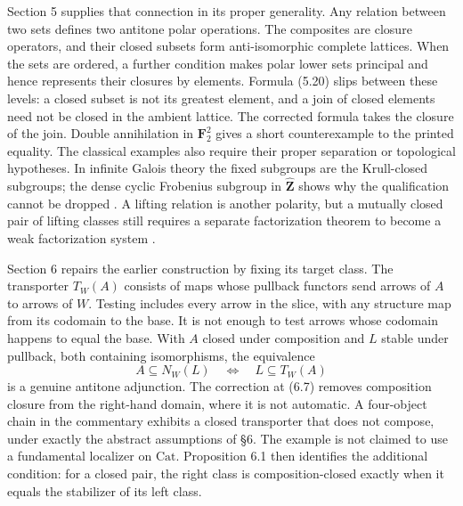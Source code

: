 Section 5 supplies that connection in its proper generality. Any relation
between two sets defines two antitone polar operations. The composites are
closure operators, and their closed subsets form anti-isomorphic complete
lattices. When the sets are ordered, a further condition makes polar lower
sets principal and hence represents their closures by elements. Formula
(5.20) slips between these levels: a closed subset is not its greatest
element, and a join of closed elements need not be closed in the ambient
lattice. The corrected formula takes the closure of the join. Double
annihilation in $\mathbf F_2^2$ gives a short counterexample to the printed
equality. The classical examples also require their proper separation or
topological hypotheses. In infinite Galois theory the fixed subgroups are
the Krull-closed subgroups; the dense cyclic Frobenius subgroup in
$\widehat{\mathbf Z}$ shows why the qualification cannot be dropped
\citep[Proposition 7.12 and Theorem 7.13]{Milne2022FT}. A lifting relation is
another polarity, but a mutually closed pair of lifting classes still
requires a separate factorization theorem to become a weak factorization
system \citep[Definition 11.2.1]{Riehl2014}.

Section 6 repairs the earlier construction by fixing its target class.
The transporter $T_W(A)$ consists of maps whose pullback functors send
arrows of $A$ to arrows of $W$. Testing includes every arrow in the slice,
with any structure map from its codomain to the base. It is not enough to
test arrows whose codomain happens to equal the base. With $A$ closed under
composition and $L$ stable under pullback, both containing isomorphisms,
the equivalence
\[
 A\subseteq N_W(L)\quad\Longleftrightarrow\quad L\subseteq T_W(A)
\]
is a genuine antitone adjunction. The correction at (6.7) removes
composition closure from the right-hand domain, where it is not automatic.
A four-object chain in the commentary exhibits a closed transporter that
does not compose, under exactly the abstract assumptions of \S6. The
example is not claimed to use a fundamental localizer on $\mathrm{Cat}$.
Proposition 6.1 then identifies the additional condition: for a closed pair,
the right class is composition-closed exactly when it equals the stabilizer
of its left class.

